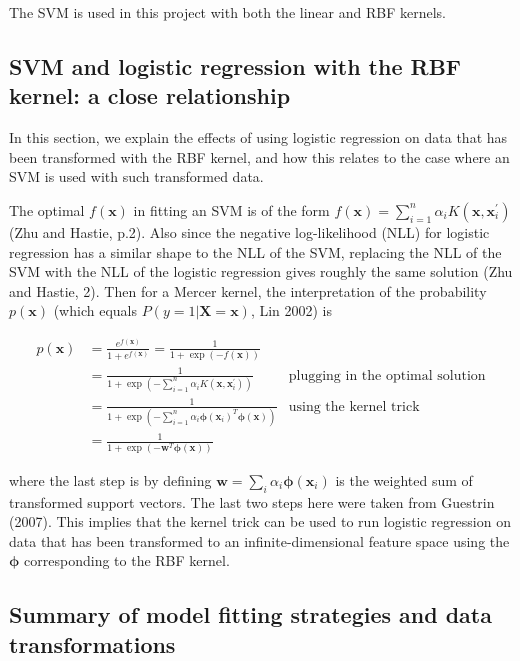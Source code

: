 \documentclass[letterpaper, 12pt]{article}
\newcommand{\vect}[1]{\boldsymbol{#1}}
\begin{document}
The SVM is used in this project with both the linear and RBF kernels.

\subsection{SVM and logistic regression with the RBF kernel: a close relationship}

In this section, we explain the effects of using logistic regression on data that has been transformed with the RBF kernel, and how this relates to the case where an SVM is used with such transformed data.

The optimal $f(\vect{x})$ in fitting an SVM is of the form $f(\vect{x}) = \sum_{i=1}^{n} \alpha_i K(\vect{x}, \vect{x}_i^\prime)$ (Zhu and Hastie, p.2). Also since the negative log-likelihood (NLL) for logistic regression has a similar shape to the NLL of the SVM, replacing the NLL of the SVM with the NLL of the logistic regression gives roughly the same solution (Zhu and Hastie, 2). Then for a Mercer kernel, the interpretation of the probability $p(\vect{x})$ (which equals $P(y = 1 | \vect{X} = \vect{x})$, Lin 2002) is

\begin{align*}
  p(\vect{x}) & = \frac{e^{f(\vect{x})}}{1 + e^{f(\vect{x})}} = \frac{1}{1 + \exp({-f(\vect{x})})} & \\
  & = \frac{1}{1 + \exp(-\sum_{i=1}^{n} \alpha_i K(\vect{x}, \vect{x}_i^\prime))} & \text{plugging in the optimal solution} \\
  & = \frac{1}{1 + \exp(-\sum_{i=1}^{n} \alpha_i \vect{\phi}(\vect{x}_i)^T \vect{\phi}(\vect{x}))} & \text{using the kernel trick} \\
  & = \frac{1}{1 + \exp(-\vect{w}^T \vect{\phi}(\vect{x}))} &
\end{align*}

where the last step is by defining $\vect{w} = \sum_{i} \alpha_i \vect{\phi}(\vect{x}_i)$ is the weighted sum of transformed support vectors. The last two steps here were taken from Guestrin (2007). This implies that the kernel trick can be used to run logistic regression on data that has been transformed to an infinite-dimensional feature space using the $\vect{\phi}$ corresponding to the RBF kernel.

\subsection{Summary of model fitting strategies and data transformations}
\end{document}
